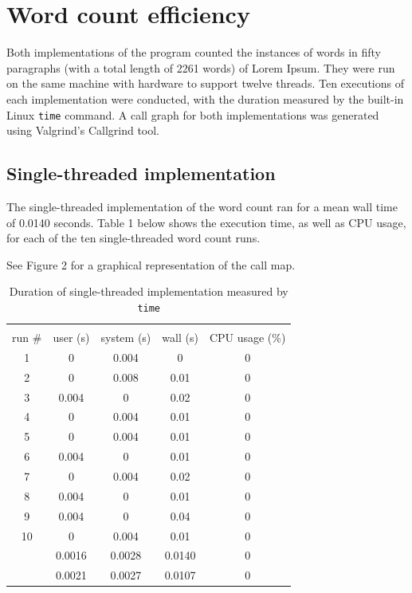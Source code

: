 \documentclass[12pt, letterpaper]{article}
\begin{document}
\section{Word count efficiency}
	Both implementations of the program counted the instances of words in fifty paragraphs (with a total length of 2261 words) of Lorem Ipsum. They were run on the same machine with hardware to support twelve threads. Ten executions of each implementation were conducted, with the duration measured by the built-in Linux \texttt{time} command. A call graph for both implementations was generated using Valgrind's Callgrind tool.
\subsection{Single-threaded implementation}
	The single-threaded implementation of the word count ran for a mean wall time of 0.0140 seconds. Table 1 below shows the execution time, as well as CPU usage, for each of the ten single-threaded word count runs.\newline
	
	See Figure 2 for a graphical representation of the call map.

	\begin{table}[h]
	\centering
	\begin{tabular}{ccccc}
	\rowcolor[HTML]{FFFFC7} 
	\multicolumn{5}{c}{\cellcolor[HTML]{FFFFC7}\textbf{Execution times for single-threaded word count}} \\
	\rowcolor[HTML]{EFEFEF} 
	run \# & user (s) & system (s) & wall (s) & CPU usage (\%) \\
	1 & 0 & 0.004 & 0 & 0 \\
	2 & 0 & 0.008 & 0.01 & 0 \\
	3 & 0.004 & 0 & 0.02 & 0 \\
	4 & 0 & 0.004 & 0.01 & 0 \\
	5 & 0 & 0.004 & 0.01 & 0 \\
	6 & 0.004 & 0 & 0.01 & 0 \\
	7 & 0 & 0.004 & 0.02 & 0 \\
	8 & 0.004 & 0 & 0.01 & 0 \\
	9 & 0.004 & 0 & 0.04 & 0 \\
	10 & 0 & 0.004 & 0.01 & 0 \\
	\rowcolor[HTML]{D0F0D0} 
	\multicolumn{1}{r}{\cellcolor[HTML]{9AFF99}mean (s)} & 0.0016 & 0.0028 & 0.0140 & 0 \\
	\rowcolor[HTML]{ECF4FF} 
	\multicolumn{1}{r}{\cellcolor[HTML]{DAE8FC}std. dev. (s)} & 0.0021 & 0.0027 & 0.0107 & 0
	\end{tabular}
	\caption{Duration of single-threaded implementation measured by \texttt{time}}
	\end{table}
\end{document}
